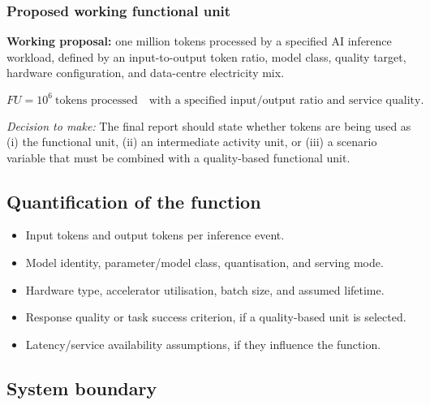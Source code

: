 \documentclass[11pt,a4paper]{article}
\begin{document}
\subsubsection{Proposed working functional unit}
\textbf{Working proposal:} one million tokens processed by a specified AI
inference workload, defined by an input-to-output token ratio, model class,
quality target, hardware configuration, and data-centre electricity mix.

\begin{equation}
    FU = 10^{6}\ \text{tokens processed}
    \quad\text{with a specified input/output ratio and service quality.}
\end{equation}

\textit{Decision to make:} The final report should state whether tokens are being
used as (i) the functional unit, (ii) an intermediate activity unit, or (iii) a
scenario variable that must be combined with a quality-based functional unit.

\subsection{Quantification of the function}
\begin{itemize}[leftmargin=*]
    \item Input tokens and output tokens per inference event.
    \item Model identity, parameter/model class, quantisation, and serving mode.
    \item Hardware type, accelerator utilisation, batch size, and assumed lifetime.
    \item Response quality or task success criterion, if a quality-based unit is
    selected.
    \item Latency/service availability assumptions, if they influence the function.
\end{itemize}

\subsection{System boundary}
\end{document}

